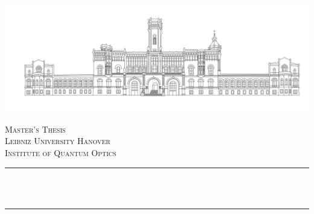 \begin{titlepage}

\newcommand{\HRule}{\rule{\linewidth}{0.5mm}} %

\begin{center}
   \includegraphics[width=\linewidth]{../GRAPHICS/luh.png}\\[1cm] %
\end{center}
 

\center %


\textsc{\LARGE Master's Thesis}\\[1.5cm] %
\textsc{\Large Leibniz University Hanover}\\[0.5cm] %
\textsc{\large Institute of Quantum Optics}\\[0.5cm] %

\makeatletter
\HRule \\[0.7cm]
{ \LARGE \bfseries \@title}\\[0.4cm] %
\HRule \\[1.5cm]
 

\end{titlepage}
